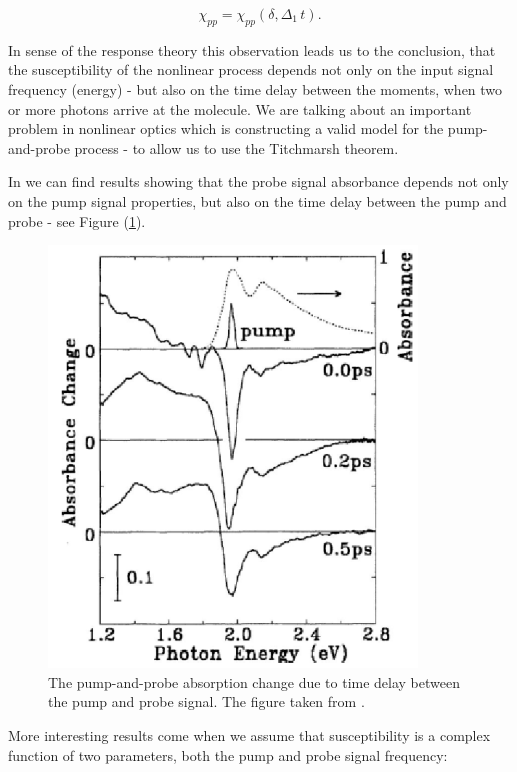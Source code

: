 \documentclass[12pt,twoside,a4paper]{article}
\numberwithin{equation}{subsection}
\numberwithin{figure}{subsection}
\begin{document}
\begin{equation} \label{eq:physical_pnp_susceptibility}
  \chi_{pp} = \chi_{pp} (\delta , \Delta_1 \, t).
\end{equation} 

In sense of the response theory this observation leads us to the conclusion, that the susceptibility of the nonlinear process depends not
only on the input signal frequency (energy) - but also on the time delay between the moments, when two or more photons arrive at
the molecule. We are talking about an important problem in nonlinear optics which is constructing a valid model for the pump-and-probe
process - to allow us to use the Titchmarsh theorem. 

In \cite{christodoulides_nonlinear} we can find results showing that the probe signal absorbance depends not only on the pump
signal properties, but also on the time delay between the pump and probe - see Figure (\ref{physical_fig:pnp_absorption}).

\begin{figure} 
	\begin{center}
		\includegraphics{img/pnp_abs.png}
		\caption{The pump-and-probe absorption change due to time delay between the pump and probe signal. The figure taken from
		\cite{christodoulides_nonlinear}. \label{physical_fig:pnp_absorption} }
	\end{center}
\end{figure}


More interesting results come when we assume that susceptibility is a complex function of two parameters, both the pump and
probe signal frequency:
\end{document}
